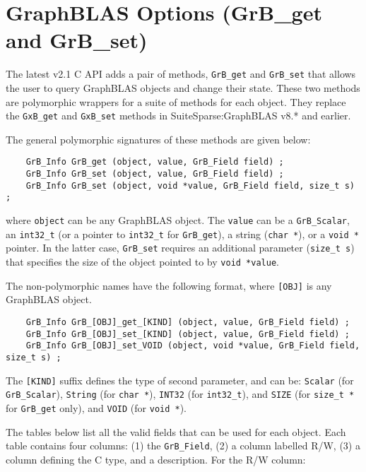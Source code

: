 
\section{GraphBLAS Options ({\sf GrB\_get} and {\sf GrB\_set})}
\label{options}

The latest v2.1 C API adds a pair of methods, \verb'GrB_get' and \verb'GrB_set'
that allows the user to query GraphBLAS objects and change their state.  These
two methods are polymorphic wrappers for a suite of methods for each object.
They replace the \verb'GxB_get' and \verb'GxB_set' methods in
SuiteSparse:GraphBLAS v8.* and earlier.

The general polymorphic signatures of these methods are given below:

{\footnotesize
\begin{verbatim}
    GrB_Info GrB_get (object, value, GrB_Field field) ;
    GrB_Info GrB_set (object, value, GrB_Field field) ;
    GrB_Info GrB_set (object, void *value, GrB_Field field, size_t s) ; \end{verbatim}}

\noindent
where \verb'object' can be any GraphBLAS object.  The \verb'value' can be a
\verb'GrB_Scalar', an \verb'int32_t' (or a pointer to \verb'int32_t' for
\verb'GrB_get'), a string (\verb'char *'), or a \verb'void *' pointer.  In the
latter case, \verb'GrB_set' requires an additional parameter (\verb'size_t s')
that specifies the size of the object pointed to by \verb'void *value'.

The non-polymorphic names have the following format, where \verb'[OBJ]'
is any GraphBLAS object. 

{\footnotesize
\begin{verbatim}
    GrB_Info GrB_[OBJ]_get_[KIND] (object, value, GrB_Field field) ;
    GrB_Info GrB_[OBJ]_set_[KIND] (object, value, GrB_Field field) ;
    GrB_Info GrB_[OBJ]_set_VOID (object, void *value, GrB_Field field, size_t s) ; \end{verbatim}}

The \verb'[KIND]' suffix defines the type of second parameter, and can be:
    \verb'Scalar' (for \verb'GrB_Scalar'),
    \verb'String' (for \verb'char *'),
    \verb'INT32' (for \verb'int32_t'), and
    \verb'SIZE' (for \verb'size_t *' for \verb'GrB_get' only), and
    \verb'VOID' (for \verb'void *').

The tables below list all the valid fields that can be used for each object. 
Each table contains four columns:  (1) the \verb'GrB_Field',
(2) a column labelled R/W, (3) a column defining the C type, and a description.
For the R/W column:

